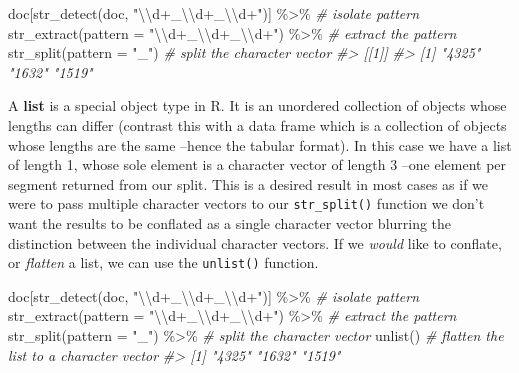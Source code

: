 \documentclass[
]{article}
\newenvironment{Shaded}{\begin{snugshade}}{\end{snugshade}}
\newcommand{\AttributeTok}[1]{\textcolor[rgb]{0.77,0.63,0.00}{#1}}
\newcommand{\CommentTok}[1]{\textcolor[rgb]{0.56,0.35,0.01}{\textit{#1}}}
\newcommand{\FunctionTok}[1]{\textcolor[rgb]{0.00,0.00,0.00}{#1}}
\newcommand{\NormalTok}[1]{#1}
\newcommand{\SpecialCharTok}[1]{\textcolor[rgb]{0.00,0.00,0.00}{#1}}
\newcommand{\StringTok}[1]{\textcolor[rgb]{0.31,0.60,0.02}{#1}}
\begin{document}
\begin{Shaded}
\begin{Highlighting}[]
\NormalTok{doc[}\FunctionTok{str\_detect}\NormalTok{(doc, }\StringTok{"}\SpecialCharTok{\textbackslash{}\textbackslash{}}\StringTok{d+\_}\SpecialCharTok{\textbackslash{}\textbackslash{}}\StringTok{d+\_}\SpecialCharTok{\textbackslash{}\textbackslash{}}\StringTok{d+"}\NormalTok{)] }\SpecialCharTok{\%\textgreater{}\%} \CommentTok{\# isolate pattern}
  \FunctionTok{str\_extract}\NormalTok{(}\AttributeTok{pattern =} \StringTok{"}\SpecialCharTok{\textbackslash{}\textbackslash{}}\StringTok{d+\_}\SpecialCharTok{\textbackslash{}\textbackslash{}}\StringTok{d+\_}\SpecialCharTok{\textbackslash{}\textbackslash{}}\StringTok{d+"}\NormalTok{) }\SpecialCharTok{\%\textgreater{}\%} \CommentTok{\# extract the pattern}
  \FunctionTok{str\_split}\NormalTok{(}\AttributeTok{pattern =} \StringTok{"\_"}\NormalTok{) }\CommentTok{\# split the character vector}
\CommentTok{\#\textgreater{} [[1]]}
\CommentTok{\#\textgreater{} [1] "4325" "1632" "1519"}
\end{Highlighting}
\end{Shaded}

A \textbf{list} is a special object type in R. It is an unordered collection of objects whose lengths can differ (contrast this with a data frame which is a collection of objects whose lengths are the same --hence the tabular format). In this case we have a list of length 1, whose sole element is a character vector of length 3 --one element per segment returned from our split. This is a desired result in most cases as if we were to pass multiple character vectors to our \texttt{str\_split()} function we don't want the results to be conflated as a single character vector blurring the distinction between the individual character vectors. If we \emph{would} like to conflate, or \emph{flatten} a list, we can use the \texttt{unlist()} function.

\begin{Shaded}
\begin{Highlighting}[]
\NormalTok{doc[}\FunctionTok{str\_detect}\NormalTok{(doc, }\StringTok{"}\SpecialCharTok{\textbackslash{}\textbackslash{}}\StringTok{d+\_}\SpecialCharTok{\textbackslash{}\textbackslash{}}\StringTok{d+\_}\SpecialCharTok{\textbackslash{}\textbackslash{}}\StringTok{d+"}\NormalTok{)] }\SpecialCharTok{\%\textgreater{}\%} \CommentTok{\# isolate pattern}
  \FunctionTok{str\_extract}\NormalTok{(}\AttributeTok{pattern =} \StringTok{"}\SpecialCharTok{\textbackslash{}\textbackslash{}}\StringTok{d+\_}\SpecialCharTok{\textbackslash{}\textbackslash{}}\StringTok{d+\_}\SpecialCharTok{\textbackslash{}\textbackslash{}}\StringTok{d+"}\NormalTok{) }\SpecialCharTok{\%\textgreater{}\%} \CommentTok{\# extract the pattern}
  \FunctionTok{str\_split}\NormalTok{(}\AttributeTok{pattern =} \StringTok{"\_"}\NormalTok{) }\SpecialCharTok{\%\textgreater{}\%} \CommentTok{\# split the character vector}
  \FunctionTok{unlist}\NormalTok{() }\CommentTok{\# flatten the list to a character vector}
\CommentTok{\#\textgreater{} [1] "4325" "1632" "1519"}
\end{Highlighting}
\end{Shaded}
\end{document}
